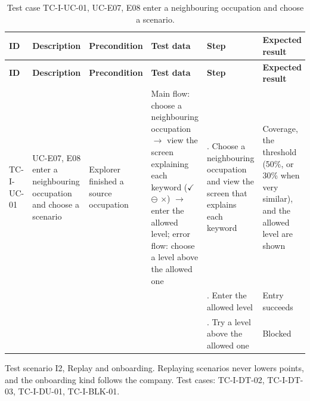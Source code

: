 {\footnotesize{}\renewcommand{\arraystretch}{1.1}
\begin{longtable}{|>{\raggedright\arraybackslash}p{}|>{\raggedright\arraybackslash}p{}|>{\raggedright\arraybackslash}p{}|>{\raggedright\arraybackslash}p{}|>{\raggedright\arraybackslash}p{}|>{\raggedright\arraybackslash}p{}|}
\caption{Test case TC-I-UC-01, UC-E07, E08 enter a neighbouring occupation and choose a scenario.} \\
\hline
\textbf{ID} & \textbf{Description} & \textbf{Precondition} & \textbf{Test data} & \textbf{Step} & \textbf{Expected result} \\ \hline
\endfirsthead
\hline
\textbf{ID} & \textbf{Description} & \textbf{Precondition} & \textbf{Test data} & \textbf{Step} & \textbf{Expected result} \\ \hline
\endhead
TC-I-UC-01 & UC-E07, E08 enter a neighbouring occupation and choose a scenario & Explorer finished a source occupation & Main flow: choose a neighbouring occupation $\rightarrow$ view the screen explaining each keyword ($\checkmark$ $\ominus$ $\times$) $\rightarrow$ enter the allowed level; error flow: choose a level above the allowed one & 1. Choose a neighbouring occupation and view the screen that explains each keyword & Coverage, the threshold (50\%, or 30\% when very similar), and the allowed level are shown \\ \cline{5-6}
 &  &  &  & 2. Enter the allowed level & Entry succeeds \\ \cline{5-6}
 &  &  &  & 3. Try a level above the allowed one & Blocked \\ \hline
\end{longtable}
}

Test scenario I2, Replay and onboarding. Replaying scenarios never lowers points, and the onboarding kind follows the company. Test cases: TC-I-DT-02, TC-I-DT-03, TC-I-DU-01, TC-\allowbreak{}I-\allowbreak{}BLK-\allowbreak{}01.


